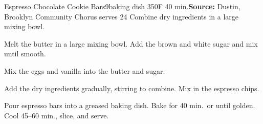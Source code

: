 \begin{recipe}{Espresso Chocolate Cookie Bars}{9\inch{}\inch baking dish \hfill 350\0F \hfill 40 min.}{\textbf{Source:} Dustin, Brooklyn Community Chorus \hfill serves 24}
 Combine dry ingredients in a large mixing bowl.

 Melt the butter in a large mixing bowl. Add the brown and white sugar and mix until smooth.

 Mix the eggs and vanilla into the butter and sugar.

 Add the dry ingredients gradually, stirring to combine. Mix in the espresso chips.

 \newstep Pour espresso bars into a greased baking dish. Bake for 40 min.\ or until golden. Cool 45--60 min., slice, and serve.
\end{recipe}
